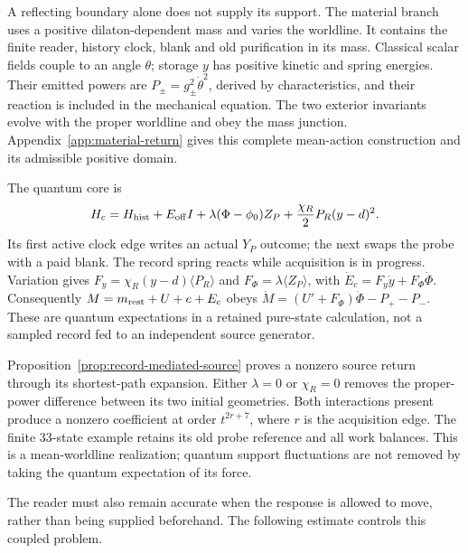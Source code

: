 \documentclass[12pt,a4paper]{article}
\begin{document}
A reflecting boundary alone does not supply its support. The material
branch uses a positive dilaton-dependent mass and varies the worldline.
It contains the finite reader, history clock, blank and old purification
in its mass. Classical scalar fields couple to an angle $\theta$; storage
$y$ has positive kinetic and spring energies. Their emitted powers are
$P_\pm=g_\pm^2\dot\theta^2$, derived by characteristics, and their
reaction is included in the mechanical equation. The two exterior
invariants evolve with the proper worldline and obey the mass junction.
Appendix~\ref{app:material-return} gives this complete mean-action
construction and its admissible positive domain.

The quantum core is
\[
 H_c=H_{\rm hist}+E_{\rm off}I+
 \lambda(\Phi-\phi_0)Z_P+
 \frac{\chi_R}{2}P_R(y-d)^2.
\]
Its first active clock edge writes an actual $Y_P$ outcome; the next
swaps the probe with a paid blank. The record spring reacts while
acquisition is in progress. Variation gives
$F_y=\chi_R(y-d)\langle P_R\rangle$ and
$F_\Phi=\lambda\langle Z_P\rangle$, with
$\dot E_c=F_y\dot y+F_\Phi\dot\Phi$.
Consequently $M=m_{\rm rest}+U+e+E_c$ obeys
$\dot M=(U'+F_\Phi)\dot\Phi-P_+-P_-$.
These are quantum expectations in a retained pure-state calculation,
not a sampled record fed to an independent source generator.

Proposition~\ref{prop:record-mediated-source} proves a nonzero source
return through its shortest-path expansion. Either $\lambda=0$ or
$\chi_R=0$ removes the proper-power difference between its two initial
geometries. Both interactions present produce a nonzero coefficient at
order $t^{2r+7}$, where $r$ is the acquisition edge. The finite
33-state example retains its old probe reference and all work balances.
This is a mean-worldline realization; quantum support fluctuations
are not removed by taking the quantum expectation of its force.

The reader must also remain accurate when the response is allowed to
move, rather than being supplied beforehand. The following estimate
controls this coupled problem.
\end{document}
